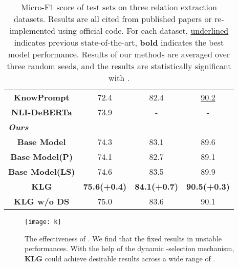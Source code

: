 \begin{table}[]
\begin{tabular}{cccc}
\multicolumn{1}{c|}{\textbf{KnowPrompt}}      & \multicolumn{1}{c|}{72.4}                & \multicolumn{1}{c|}{82.4}                    & \multicolumn{1}{c}{\underline{90.2}}                                        \\
\multicolumn{1}{c|}{\textbf{NLI-DeBERTa}}     & \multicolumn{1}{c|}{73.9}                & \multicolumn{1}{c|}{-}                       & -                                        \\ \hline
\multicolumn{4}{l}{\textit{\textbf{Ours}}}                                                                                                                                         \\ \hline
\multicolumn{1}{c|}{\textbf{Base Model}}             & \multicolumn{1}{c|}{74.3} & \multicolumn{1}{c|}{83.1}     & 89.6                      \\
\multicolumn{1}{c|}{\textbf{Base Model(P)}}             & \multicolumn{1}{c|}{74.1} & \multicolumn{1}{c|}{82.7}     & 89.1                      \\
\multicolumn{1}{c|}{\textbf{Base Model(LS)}}             & \multicolumn{1}{c|}{74.6} & \multicolumn{1}{c|}{83.5}     & 89.9                      \\
\multicolumn{1}{c|}{\textbf{KLG}}             & \multicolumn{1}{c|}{\textbf{75.6(+0.4)}} & \multicolumn{1}{c|}{\textbf{84.1(+0.7)}}     & \textbf{90.5(+0.3)}                      \\ 
\multicolumn{1}{c|}{\textbf{KLG w/o DS}}             & \multicolumn{1}{c|}{75.0} & \multicolumn{1}{c|}{83.6}     & 90.1                      \\
\bottomrule[1.5pt]
\end{tabular}
\caption{Micro-F1 score of test sets on three relation extraction datasets. Results are all cited from published papers or re-implemented using official code. For each dataset, \underline{underlined} indicates previous state-of-the-art, \textbf{bold} indicates the best model performance. Results of our methods are averaged over three random seeds, and the results are statistically significant with .}
\label{main}
\end{table}




\begin{figure}[h]
	\centering
	\texttt{[image: k]}
	\caption{The effectiveness of . We find that the fixed  results in unstable performances. With the help of the dynamic -selection mechanism, \textbf{KLG} could achieve desirable results across a wide range of .}
	\label{k_number}
\end{figure}

